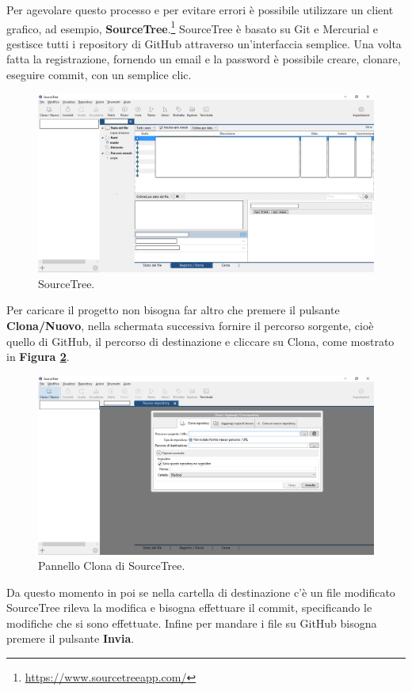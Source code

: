 \documentclass[a4paper,11pt]{article}
\begin{document}
Per agevolare questo processo e per evitare errori è possibile utilizzare un client grafico, ad esempio, \textbf{SourceTree}.\footnote{\url{https://www.sourcetreeapp.com/}}
SourceTree è basato su Git e Mercurial e gestisce tutti i repository di GitHub attraverso un'interfaccia semplice.
Una volta fatta la registrazione, fornendo un email e la password è 
possibile creare, clonare, eseguire commit, con un semplice clic.
\begin{figure}[!htpb]
	\centering
	\includegraphics[scale=0.30]{sourcetree.png}
	\caption{SourceTree.}
	\label{fig:14}
\end{figure}
Per caricare il progetto non bisogna far altro che premere il pulsante \textbf{Clona/Nuovo}, nella schermata successiva fornire il percorso sorgente, cioè quello di GitHub, il percorso di destinazione e cliccare su Clona, come mostrato in \textbf{Figura \ref{fig:15}}.
\begin{figure}[!htpb]
	\centering
	\includegraphics[scale=0.30]{sourcetree2.png}
	\caption{Pannello Clona di SourceTree.}
	\label{fig:15}
\end{figure}\newpage
Da questo momento in poi se nella cartella di destinazione c'è un file modificato SourceTree rileva la modifica e bisogna effettuare il commit, specificando le modifiche che si sono effettuate. 
Infine per mandare i file su GitHub bisogna premere il pulsante \textbf{Invia}. 
\newpage
\end{document}

